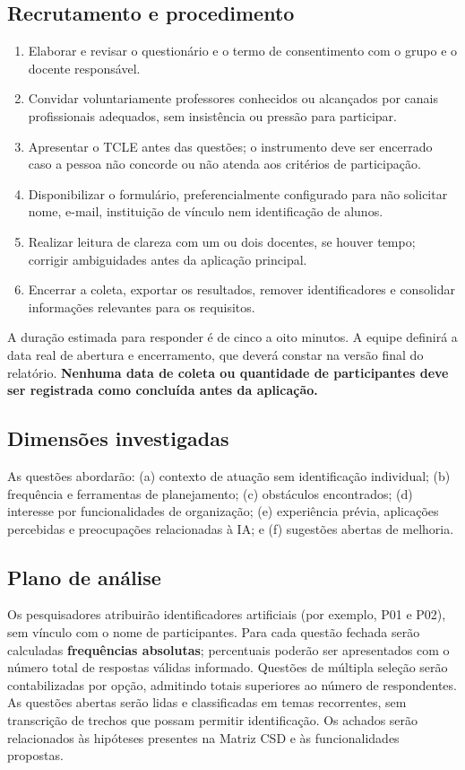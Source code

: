 \documentclass[12pt,a4paper,oneside]{report}
\begin{document}
\subsection{Recrutamento e procedimento}
\begin{enumerate}
  \item Elaborar e revisar o questionário e o termo de consentimento com o grupo e o docente responsável.
  \item Convidar voluntariamente professores conhecidos ou alcançados por canais profissionais adequados, sem insistência ou pressão para participar.
  \item Apresentar o TCLE antes das questões; o instrumento deve ser encerrado caso a pessoa não concorde ou não atenda aos critérios de participação.
  \item Disponibilizar o formulário, preferencialmente configurado para não solicitar nome, e-mail, instituição de vínculo nem identificação de alunos.
  \item Realizar leitura de clareza com um ou dois docentes, se houver tempo; corrigir ambiguidades antes da aplicação principal.
  \item Encerrar a coleta, exportar os resultados, remover identificadores e consolidar informações relevantes para os requisitos.
\end{enumerate}
A duração estimada para responder é de cinco a oito minutos. A equipe definirá a data real de abertura e encerramento, que deverá constar na versão final do relatório. \textbf{Nenhuma data de coleta ou quantidade de participantes deve ser registrada como concluída antes da aplicação.}

\subsection{Dimensões investigadas}
As questões abordarão: (a) contexto de atuação sem identificação individual; (b) frequência e ferramentas de planejamento; (c) obstáculos encontrados; (d) interesse por funcionalidades de organização; (e) experiência prévia, aplicações percebidas e preocupações relacionadas à IA; e (f) sugestões abertas de melhoria.

\subsection{Plano de análise}
Os pesquisadores atribuirão identificadores artificiais (por exemplo, P01 e P02), sem vínculo com o nome de participantes. Para cada questão fechada serão calculadas \textbf{frequências absolutas}; percentuais poderão ser apresentados com o número total de respostas válidas informado. Questões de múltipla seleção serão contabilizadas por opção, admitindo totais superiores ao número de respondentes. As questões abertas serão lidas e classificadas em temas recorrentes, sem transcrição de trechos que possam permitir identificação. Os achados serão relacionados às hipóteses presentes na Matriz CSD e às funcionalidades propostas.
\end{document}

